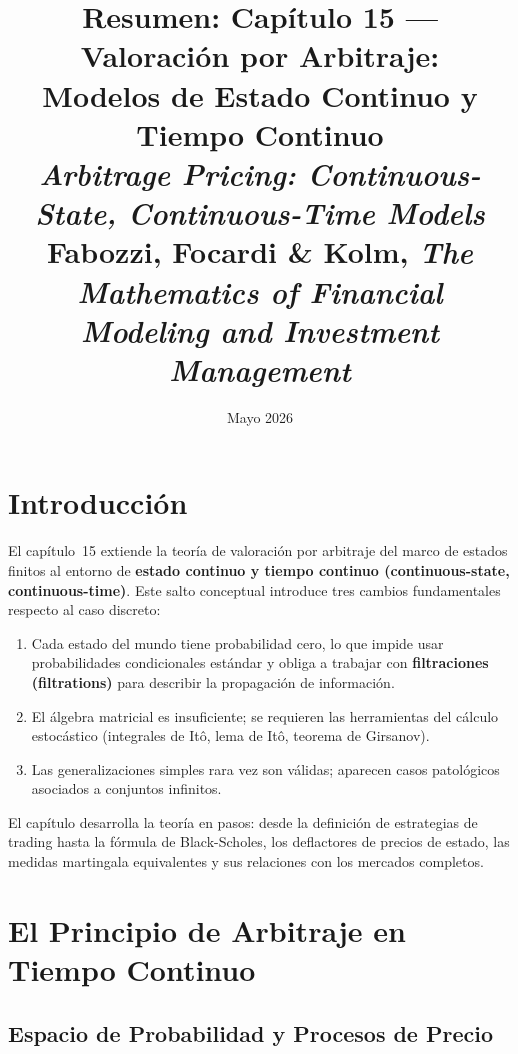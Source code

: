 \documentclass[12pt]{article}
\title{\textbf{Resumen: Cap\'itulo 15 --- Valoraci\'on por Arbitraje:\\
Modelos de Estado Continuo y Tiempo Continuo}\\
\large \textit{Arbitrage Pricing: Continuous-State, Continuous-Time Models}\\
\normalsize Fabozzi, Focardi \& Kolm, \textit{The Mathematics of Financial Modeling and Investment Management}}
\author{}
\date{Mayo 2026}
\begin{document}
\maketitle
\tableofcontents
\newpage

\section{Introducci\'on}

El cap\'itulo~15 extiende la teor\'ia de valoraci\'on por arbitraje del marco de estados finitos al entorno de \textbf{estado continuo y tiempo continuo (continuous-state, continuous-time)}. Este salto conceptual introduce tres cambios fundamentales respecto al caso discreto:

\begin{enumerate}
  \item Cada estado del mundo tiene probabilidad cero, lo que impide usar probabilidades condicionales est\'andar y obliga a trabajar con \textbf{filtraciones (filtrations)} para describir la propagaci\'on de informaci\'on.
  \item El \'algebra matricial es insuficiente; se requieren las herramientas del c\'alculo estoc\'astico (integrales de It\^o, lema de It\^o, teorema de Girsanov).
  \item Las generalizaciones simples rara vez son v\'alidas; aparecen casos patol\'ogicos asociados a conjuntos infinitos.
\end{enumerate}

El cap\'itulo desarrolla la teor\'ia en pasos: desde la definici\'on de estrategias de trading hasta la f\'ormula de Black-Scholes, los deflactores de precios de estado, las medidas martingala equivalentes y sus relaciones con los mercados completos.

\section{El Principio de Arbitraje en Tiempo Continuo}

\subsection{Espacio de Probabilidad y Procesos de Precio}
\end{document}

